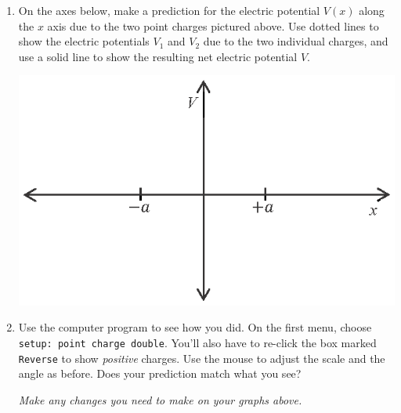 \begin{enumerate}[wide, label=(\emph{\alph*})]

\item On the axes below, make a prediction for the electric potential $V(x)$ along the $x$ axis due to the two point charges pictured above.  Use dotted lines to show the electric potentials $V_1$ and $V_2$ due to the two individual charges, and use a solid line to show the resulting net electric potential $V$.  
\begin{center}
\includegraphics{potential_superposition/activity_2_3_figs/V_axes.eps}
\end{center}

\item Use the computer program to see how you did.  On the first menu, choose \verb!setup: point charge double!.  You'll also have to re-click the box marked \verb!Reverse! to show \textit{positive} charges.  Use the mouse to adjust the scale and the angle as before.  Does your prediction match what you see?
\answerspace{0.3in}

\textit{Make any changes you need to make on your graphs above.}


\end{enumerate}

